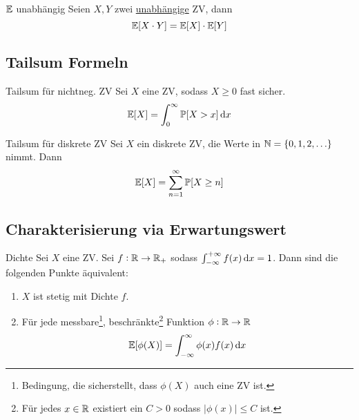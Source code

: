 \begin{theorem}{$\mathbb{E}$ unabhängig}
	Seien $X,Y$ zwei \underline{unabhängige} ZV, dann
	\begin{equation*}
		\mathbb{E} [X \cdot Y] = \mathbb{E} [X] \cdot \mathbb{E} [Y]
	\end{equation*}
\end{theorem}


\subsection{Tailsum Formeln}%
\label{sub:tailsum_formeln}

\begin{tprop}{Tailsum für nichtneg. ZV}
	Sei $X$ eine ZV, sodass $X \geq 0$ fast sicher.
	\begin{equation*}
		\E [X] = \int_{0}^{\infty} \pr [X > x] \dif x
	\end{equation*}
\end{tprop}
\begin{tprop}{Tailsum für diskrete ZV}
	Sei $X$ ein diskrete ZV, die Werte in $\mathbb{N} = \{0,1,2,\ldots\}$ nimmt. Dann
	\begin{equation*}
		\mathbb{E} [X] = \sum_{n=1}^{\infty} \mathbb{P} [X \geq n]
	\end{equation*}
\end{tprop}


\subsection{Charakterisierung via Erwartungswert}%
\label{sub:charakterisierung_via_erwartungswert}

\begin{tprop}{Dichte}
	Sei $X$ eine ZV. Sei $f : \mathbb{R} \rightarrow \mathbb{R}_+$ sodass $\int_{-\infty}^{+\infty} f(x) \dif x = 1$. Dann sind die
	folgenden Punkte äquivalent:
	\begin{enumerate}
		\item $X$ ist stetig mit Dichte $f$.
		\item Für jede messbare\footnote{Bedingung, die sicherstellt, dass $\phi (X)$ auch eine ZV ist.},
			beschränkte\footnote{Für jedes $x \in \mathbb{R}$ existiert ein $C > 0$ sodass $|\phi (x) | \leq C$ ist.} Funktion $\phi : \mathbb{R} \rightarrow \mathbb{R}$
			\begin{equation*}
				\E [\phi (X)] = \int_{- \infty}^{\infty} \phi(x) f(x) \dif x
			\end{equation*}
	\end{enumerate}
\end{tprop}

